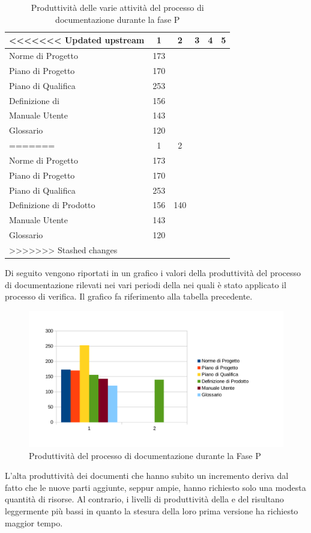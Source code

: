 \begin{table}[H]
      \centering
		\begin{tabu}{| l | c | c | c | c | c |}
		\hline
<<<<<<< Updated upstream
		&1	&2	&3	&4	&5	\\ \hline
		Norme di Progetto	& 173 &	&	&	& \\ \hline
		Piano di Progetto	& 170 &	&	&	& \\ \hline
		Piano di Qualifica	& 253	&	&	&	&\\ \hline
		Definizione di  & 156 &	 	&	&  	&\\ \hline
		Manuale Utente & 143	&	&	&	& \\ \hline
		Glossario & 120 &  & & &\\ \hline
=======
		&1	&2	\\ \hline
		Norme di Progetto	& 173 &	 \\ \hline
		Piano di Progetto	& 170 &	 \\ \hline
		Piano di Qualifica	& 253 & \\ \hline
		Definizione di Prodotto & 156 & 140	 \\ \hline
		Manuale Utente & 143 &   \\ \hline
		Glossario & 120 &  \\ \hline
>>>>>>> Stashed changes
		\end{tabu}
		\caption{Produttività delle varie attività del processo di documentazione durante la fase P}
\end{table}
Di seguito vengono riportati in un grafico i valori della produttività del processo di documentazione rilevati nei vari periodi della  nei quali è stato applicato il processo di verifica. Il grafico fa riferimento alla tabella precedente.\\
\begin{figure}[H]
	\centering
		\includegraphics[width=12cm]{PianoDiQualifica/Pics/ProduttivitaDocumentazioneFaseP.pdf}
	\caption{Produttività del processo di documentazione durante la Fase P}
\end{figure}
L'alta produttività dei documenti che hanno subito un incremento deriva dal fatto che le nuove parti aggiunte, seppur ampie, hanno richiesto solo una modesta quantità di risorse.
Al contrario, i livelli di produttività della  e del  risultano leggermente più bassi in quanto la stesura della loro prima versione ha richiesto maggior tempo.

